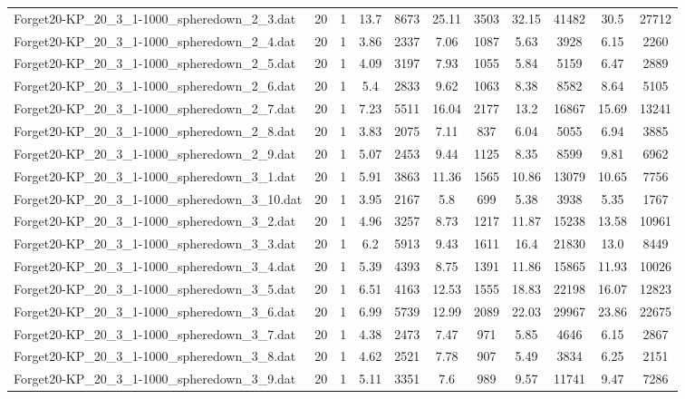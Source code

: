 \begin{table}[!ht]
\begin{tabular}{lcccccccccc}
Forget20-KP\_20\_3\_1-1000\_spheredown\_2\_3.dat & 20 & 1 & 13.7 & 8673 & 25.11 & 3503 & 32.15 & 41482 & 30.5 & 27712 \\
Forget20-KP\_20\_3\_1-1000\_spheredown\_2\_4.dat & 20 & 1 & 3.86 & 2337 & 7.06 & 1087 & 5.63 & 3928 & 6.15 & 2260 \\
Forget20-KP\_20\_3\_1-1000\_spheredown\_2\_5.dat & 20 & 1 & 4.09 & 3197 & 7.93 & 1055 & 5.84 & 5159 & 6.47 & 2889 \\
Forget20-KP\_20\_3\_1-1000\_spheredown\_2\_6.dat & 20 & 1 & 5.4 & 2833 & 9.62 & 1063 & 8.38 & 8582 & 8.64 & 5105 \\
Forget20-KP\_20\_3\_1-1000\_spheredown\_2\_7.dat & 20 & 1 & 7.23 & 5511 & 16.04 & 2177 & 13.2 & 16867 & 15.69 & 13241 \\
Forget20-KP\_20\_3\_1-1000\_spheredown\_2\_8.dat & 20 & 1 & 3.83 & 2075 & 7.11 & 837 & 6.04 & 5055 & 6.94 & 3885 \\
Forget20-KP\_20\_3\_1-1000\_spheredown\_2\_9.dat & 20 & 1 & 5.07 & 2453 & 9.44 & 1125 & 8.35 & 8599 & 9.81 & 6962 \\
Forget20-KP\_20\_3\_1-1000\_spheredown\_3\_1.dat & 20 & 1 & 5.91 & 3863 & 11.36 & 1565 & 10.86 & 13079 & 10.65 & 7756 \\
Forget20-KP\_20\_3\_1-1000\_spheredown\_3\_10.dat & 20 & 1 & 3.95 & 2167 & 5.8 & 699 & 5.38 & 3938 & 5.35 & 1767 \\
Forget20-KP\_20\_3\_1-1000\_spheredown\_3\_2.dat & 20 & 1 & 4.96 & 3257 & 8.73 & 1217 & 11.87 & 15238 & 13.58 & 10961 \\
Forget20-KP\_20\_3\_1-1000\_spheredown\_3\_3.dat & 20 & 1 & 6.2 & 5913 & 9.43 & 1611 & 16.4 & 21830 & 13.0 & 8449 \\
Forget20-KP\_20\_3\_1-1000\_spheredown\_3\_4.dat & 20 & 1 & 5.39 & 4393 & 8.75 & 1391 & 11.86 & 15865 & 11.93 & 10026 \\
Forget20-KP\_20\_3\_1-1000\_spheredown\_3\_5.dat & 20 & 1 & 6.51 & 4163 & 12.53 & 1555 & 18.83 & 22198 & 16.07 & 12823 \\
Forget20-KP\_20\_3\_1-1000\_spheredown\_3\_6.dat & 20 & 1 & 6.99 & 5739 & 12.99 & 2089 & 22.03 & 29967 & 23.86 & 22675 \\
Forget20-KP\_20\_3\_1-1000\_spheredown\_3\_7.dat & 20 & 1 & 4.38 & 2473 & 7.47 & 971 & 5.85 & 4646 & 6.15 & 2867 \\
Forget20-KP\_20\_3\_1-1000\_spheredown\_3\_8.dat & 20 & 1 & 4.62 & 2521 & 7.78 & 907 & 5.49 & 3834 & 6.25 & 2151 \\
Forget20-KP\_20\_3\_1-1000\_spheredown\_3\_9.dat & 20 & 1 & 5.11 & 3351 & 7.6 & 989 & 9.57 & 11741 & 9.47 & 7286 \\

\end{tabular}
\end{table}
